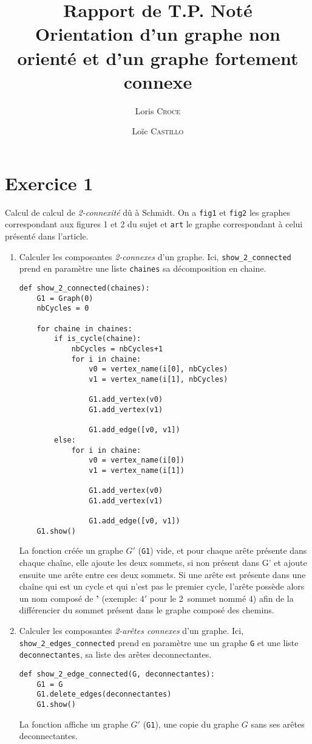 \documentclass[11pt, a4paper]{article}
\author{Loris \textsc{Croce}\and Loïc \textsc{Castillo}}
\title{
	Rapport de T.P. Noté\\
	Orientation d'un graphe non orienté et d'un graphe fortement connexe
}
\date{}
\begin{document}
\maketitle

\section*{Exercice 1}
Calcul de calcul de \emph{2-connexité} dû à Schmidt. On a \verb|fig1| et \verb|fig2| les graphes correspondant aux figures 1 et 2 du sujet et \verb|art| le graphe correspondant à celui présenté dans l'article.
\begin{enumerate}
\item Calculer les composantes \emph{2-connexes} d'un graphe. Ici, \verb|show_2_connected| prend en paramètre une liste \verb|chaines| sa décomposition en chaine.

	\begin{verbatim}
def show_2_connected(chaines):
    G1 = Graph(0)
    nbCycles = 0

    for chaine in chaines:
        if is_cycle(chaine):
            nbCycles = nbCycles+1
            for i in chaine:
                v0 = vertex_name(i[0], nbCycles)
                v1 = vertex_name(i[1], nbCycles)

                G1.add_vertex(v0)
                G1.add_vertex(v1)

                G1.add_edge([v0, v1])
        else:
            for i in chaine:
                v0 = vertex_name(i[0])
                v1 = vertex_name(i[1])

                G1.add_vertex(v0)
                G1.add_vertex(v1)

                G1.add_edge([v0, v1])
    G1.show()
    \end{verbatim}

    La fonction créée un graphe $G'$ (\verb|G1|) vide, et pour chaque arête présente dans chaque chaîne, elle ajoute les deux sommets, si non présent dans G' et ajoute ensuite une arête entre ces deux sommets.
    Si une arête est présente dans une chaîne qui est un cycle et qui n'est pas le premier cycle, l'arête possède alors un nom composé de \textbf{'} (exemple: $4'$ pour le 2\ieme\ sommet nommé $4$) afin de la différencier du sommet présent dans le graphe composé des chemins.

\item Calculer les composantes \emph{2-arêtes connexes} d'un graphe.  Ici, \verb|show_2_edges_connected| prend en paramètre une un graphe \verb|G| et une liste \verb|deconnectantes|, sa liste des arêtes deconnectantes.
	\begin{verbatim}
def show_2_edge_connected(G, deconnectantes):
    G1 = G
    G1.delete_edges(deconnectantes)
    G1.show()
   	\end{verbatim}

   	La fonction affiche un graphe $G'$ (\verb|G1|), une copie du graphe $G$ sans ses arêtes deconnectantes.
\end{enumerate}
\end{document}
